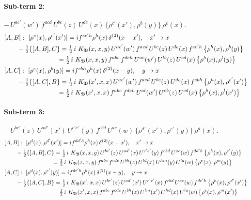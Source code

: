 \documentclass[10pt]{article}
\numberwithin{equation}{section}
\begin{document}
\paragraph{Sub-term 2:} $-\,U^{ac'}(w')\,f^{acd}\,U^{bc}(z)\,U^{de}(x)\,\big\{\rho^{c'}(x'),\rho^{b}(y)\big\}\,\rho^{e}(x)$.
\begin{align}
&[A,B]:\ [\rho^{e}(x),\rho^{c'}(x')]=i f^{ec'h}\rho^{h}(x)\,\delta^{(2)}(x-x'),\quad x'\to x\notag\\
&\qquad -\tfrac12\{[A,B],C\}=\tfrac12\,i\,\,K_{\mathfrak B}(x,x,y)\,U^{ac'}(w')\,f^{acd}\,U^{bc}(z)\,U^{de}(x)\,f^{ec'h}\,\big\{\rho^{h}(x),\rho^{b}(y)\big\}\notag\\
&\qquad\phantom{-\tfrac12\{[A,B],C\}}=\tfrac12\,i\,\,K_{\mathfrak B}(x,x,y)\,f^{abc}\,f^{deh}\,U^{ae}(w')\,U^{lb}(z)\,U^{cd}(x)\,\big\{\rho^{h}(x),\rho^{l}(y)\big\}
\label{eq:GII.I1-2-AB}\\
&[A,C]:\ [\rho^{e}(x),\rho^{b}(y)]=i f^{ebh}\rho^{h}(x)\,\delta^{(2)}(x-y),\quad y\to x\notag\\
&\qquad -\tfrac12\{[A,C],B\}=\tfrac12\,i\,\,K_{\mathfrak B}(x',x,x)\,U^{ac'}(w')\,f^{acd}\,U^{bc}(z)\,U^{de}(x)\,f^{ebh}\,\big\{\rho^{h}(x),\rho^{c'}(x')\big\}\notag\\
&\qquad\phantom{-\tfrac12\{[A,C],B\}}=\tfrac12\,i\,\,K_{\mathfrak B}(x',x,x)\,f^{abc}\,f^{deh}\,U^{al}(w')\,U^{eb}(z)\,U^{cd}(x)\,\big\{\rho^{h}(x),\rho^{l}(x')\big\}
\label{eq:GII.I1-2-AC}
\end{align}
\paragraph{Sub-term 3:} $-\,U^{bc'}(z)\,U^{ad'}(x')\,U^{c'e'}(y)\,f^{cbd}\,U^{ac}(w)\,\big\{\rho^{d'}(x'),\rho^{e'}(y)\big\}\,\rho^{d}(x)$.
\begin{align}
&[A,B]:\ [\rho^{d}(x),\rho^{d'}(x')]=i f^{dd'h}\rho^{h}(x)\,\delta^{(2)}(x-x'),\quad x'\to x\notag\\
&\qquad -\tfrac12\{[A,B],C\}=\tfrac12\,i\,\,K_{\mathfrak B}(x,x,y)\,U^{bc'}(z)\,U^{ad'}(x)\,U^{c'e'}(y)\,f^{cbd}\,U^{ac}(w)\,f^{dd'h}\,\big\{\rho^{h}(x),\rho^{e'}(y)\big\}\notag\\
&\qquad\phantom{-\tfrac12\{[A,B],C\}}=\tfrac12\,i\,\,K_{\mathfrak B}(x,x,y)\,f^{abc}\,f^{cde}\,U^{bh}(z)\,U^{ld}(x)\,U^{hm}(y)\,U^{la}(w)\,\big\{\rho^{e}(x),\rho^{m}(y)\big\}
\label{eq:GII.I1-3-AB}\\
&[A,C]:\ [\rho^{d}(x),\rho^{e'}(y)]=i f^{de'h}\rho^{h}(x)\,\delta^{(2)}(x-y),\quad y\to x\notag\\
&\qquad -\tfrac12\{[A,C],B\}=\tfrac12\,i\,\,K_{\mathfrak B}(x',x,x)\,U^{bc'}(z)\,U^{ad'}(x')\,U^{c'e'}(x)\,f^{cbd}\,U^{ac}(w)\,f^{de'h}\,\big\{\rho^{h}(x),\rho^{d'}(x')\big\}\notag\\
&\qquad\phantom{-\tfrac12\{[A,C],B\}}=\tfrac12\,i\,\,K_{\mathfrak B}(x',x,x)\,f^{abc}\,f^{cde}\,U^{bh}(z)\,U^{lm}(x')\,U^{hd}(x)\,U^{la}(w)\,\big\{\rho^{e}(x),\rho^{m}(x')\big\}
\label{eq:GII.I1-3-AC}
\end{align}
\end{document}

